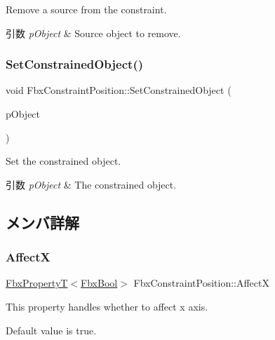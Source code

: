 Remove a source from the constraint. 
\begin{DoxyParams}{引数}
{\em p\+Object} & Source object to remove. \\
\hline
\end{DoxyParams}
\mbox{\label{class_fbx_constraint_position_a7a2604a668ec7cc7d0c04fd9cf29a01a}} 
\subsubsection{\texorpdfstring{Set\+Constrained\+Object()}{SetConstrainedObject()}}
{\footnotesize\ttfamily void Fbx\+Constraint\+Position\+::\+Set\+Constrained\+Object (\begin{DoxyParamCaption}\item[{\hyperlink{class_fbx_object}{Fbx\+Object} $\ast$}]{p\+Object }\end{DoxyParamCaption})}

Set the constrained object. 
\begin{DoxyParams}{引数}
{\em p\+Object} & The constrained object. \\
\hline
\end{DoxyParams}


\subsection{メンバ詳解}
\mbox{\label{class_fbx_constraint_position_a2488e70c6bd35dd13cafa4234a21ca5c}} 
\subsubsection{\texorpdfstring{AffectX}{AffectX}}
{\footnotesize\ttfamily \hyperlink{class_fbx_property_t}{Fbx\+PropertyT}$<$\hyperlink{fbxtypes_8h_a92e0562b2fe33e76a242f498b362262e}{Fbx\+Bool}$>$ Fbx\+Constraint\+Position\+::\+AffectX}

This property handles whether to affect x axis.

Default value is true. 

